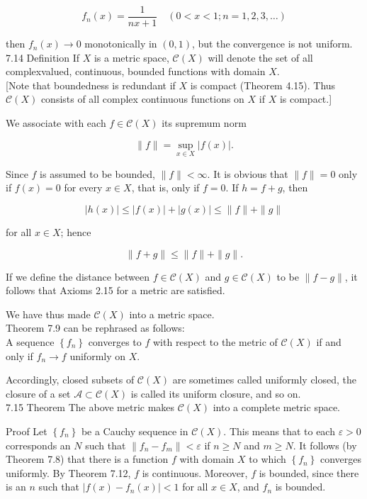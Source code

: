 \documentclass[10pt]{article}
\begin{document}
$$
f_{n}(x)=\frac{1}{n x+1} \quad(0<x<1 ; n=1,2,3, \ldots)
$$

then $f_{n}(x) \rightarrow 0$ monotonically in $(0,1)$, but the convergence is not uniform.\\
7.14 Definition If $X$ is a metric space, $\mathscr{C}(X)$ will denote the set of all complexvalued, continuous, bounded functions with domain $X$.\\[0pt]
[Note that boundedness is redundant if $X$ is compact (Theorem 4.15). Thus $\mathscr{C}(X)$ consists of all complex continuous functions on $X$ if $X$ is compact.]

We associate with each $f \in \mathscr{C}(X)$ its supremum norm

$$
\|f\|=\sup _{x \in X}|f(x)| .
$$

Since $f$ is assumed to be bounded, $\|f\|<\infty$. It is obvious that $\|f\|=0$ only if $f(x)=0$ for every $x \in X$, that is, only if $f=0$. If $h=f+g$, then

$$
|h(x)| \leq|f(x)|+|g(x)| \leq\|f\|+\|g\|
$$

for all $x \in X$; hence

$$
\|f+g\| \leq\|f\|+\|g\| .
$$

If we define the distance between $f \in \mathscr{C}(X)$ and $g \in \mathscr{C}(X)$ to be $\|f-g\|$, it follows that Axioms 2.15 for a metric are satisfied.

We have thus made $\mathscr{C}(X)$ into a metric space.\\
Theorem 7.9 can be rephrased as follows:\\
A sequence $\left\{f_{n}\right\}$ converges to $f$ with respect to the metric of $\mathscr{C}(X)$ if and only if $f_{n} \rightarrow f$ uniformly on $X$.

Accordingly, closed subsets of $\mathscr{C}(X)$ are sometimes called uniformly closed, the closure of a set $\mathscr{A} \subset \mathscr{C}(X)$ is called its uniform closure, and so on.\\
7.15 Theorem The above metric makes $\mathscr{C}(X)$ into a complete metric space.

Proof Let $\left\{f_{n}\right\}$ be a Cauchy sequence in $\mathscr{C}(X)$. This means that to each $\varepsilon>0$ corresponds an $N$ such that $\left\|f_{n}-f_{m}\right\|<\varepsilon$ if $n \geq N$ and $m \geq N$. It follows (by Theorem 7.8) that there is a function $f$ with domain $X$ to which $\left\{f_{n}\right\}$ converges uniformly. By Theorem 7.12, $f$ is continuous. Moreover, $f$ is bounded, since there is an $n$ such that $\left|f(x)-f_{n}(x)\right|<1$ for all $x \in X$, and $f_{n}$ is bounded.
\end{document}
